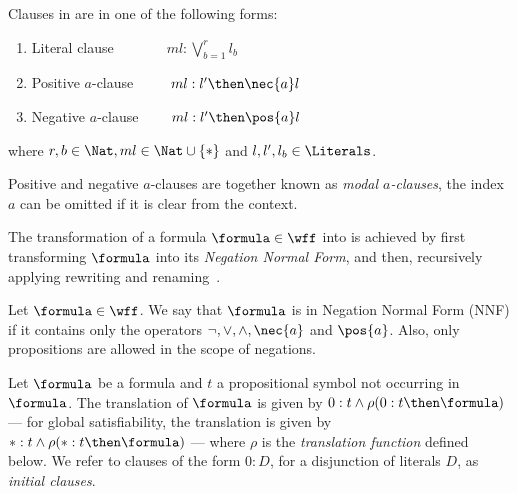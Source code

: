 \begin{definition}
    Clauses in  are in one of the following forms:
    \begin{enumerate}
        \item Literal clause $\ \ \quad \qquad ml : \bigvee^r_{b=1} l_b$
        \item Positive $a$-clause $\ \qquad ml : l' \then \nec{a} l$
        \item Negative $a$-clause $\qquad ml : l' \then \pos{a} l$
    \end{enumerate}
    where $r, b \in \Nat, ml \in \Nat \cup \{*\}$ and $l, l', l_b \in
    \Literals$.
\end{definition}

Positive and negative $a$-clauses are together known as \emph{modal
$a$-clauses}, the index $a$ can be omitted if it is clear from the context.

The transformation of a formula $\formula \in \wff$ into  is achieved
by first transforming $\formula$ into its \emph{Negation Normal Form}, and then,
recursively applying rewriting and renaming~\cite{plaisted1986structure}.

\begin{definition}
    Let $\formula \in \wff$. We say that $\formula$ is in Negation Normal Form (NNF) if
    it contains only the operators $\neg, \lor, \land, \nec{a}$ and $\pos{a}$. Also,
    only propositions are allowed in the scope of negations.
\end{definition}

Let $\formula$ be a formula and $t$ a propositional symbol not occurring in
$\formula$. The translation of $\formula$ is given by $0 : t \land \rho(0 : t
\then \formula)$ --- for global satisfiability, the translation is given by $* :
t \land \rho(* : t \then \formula)$ --- where $\rho$ is the \emph{translation
function} defined below. We refer to clauses of the form $0 : D$, for a
disjunction of literals $D$, as \emph{initial clauses}. 


